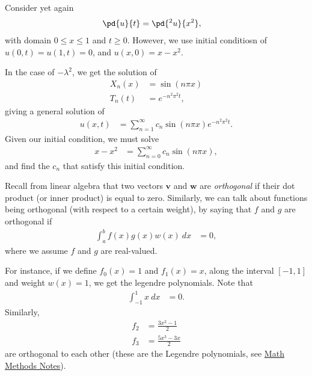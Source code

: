 \documentclass[10pt]{mypackage}
\begin{document}
\begin{example}
  Consider yet again
  \begin{align*}
    \pd{u}{t} &= \pd{^2 u}{x^2},
  \end{align*}
  with domain $0 \leq x \leq 1$ and $t\geq 0$. However, we use initial conditiosn of $u\left( 0,t \right) = u\left( 1,t \right) = 0$, and $u\left( x,0 \right) = x-x^2$.\newline

  In the case of $-\lambda^2$, we get the solution of
  \begin{align*}
    X_n(x) &= \sin\left( n\pi x \right)\\
    T_n\left( t \right) &= e^{-n^2\pi^2 t},
  \end{align*}
  giving a general solution of
  \begin{align*}
    u\left( x,t \right) &= \sum_{n=1}^{\infty}c_n\sin\left( n\pi x \right)e^{-n^2\pi^2 t}.
  \end{align*}
  Given our initial condition, we must solve
  \begin{align*}
    x-x^2 &= \sum_{n=0}^{\infty}c_n\sin\left( n\pi x \right),
  \end{align*}
  and find the $c_n$ that satisfy this initial condition.\newline

  Recall from linear algebra that two vectors $\mathbf{v}$ and $\mathbf{w}$ are \textit{orthogonal} if their dot product (or inner product) is equal to zero. Similarly, we can talk about functions being orthogonal (with respect to a certain weight), by saying that $f$ and $g$ are orthogonal if
  \begin{align*}
    \int_{a}^{b} f(x)g(x)w(x)\:dx &= 0,
  \end{align*}
  where we assume $f$ and $g$ are real-valued.\newline

  For instance, if we define $f_0(x) = 1$ and $f_1(x) = x$, along the interval $[-1,1]$ and weight $w(x) = 1$, we get the legendre polynomials. Note that
  \begin{align*}
    \int_{-1}^{1} x\:dx &= 0.
  \end{align*}
  Similarly,
  \begin{align*}
    f_2 &= \frac{3x^2 - 1}{2}\\
    f_3 &= \frac{5x^3 - 3x}{2}
  \end{align*}
  are orthogonal to each other (these are the Legendre polynomials, see \href{https://ai.avinash-iyer.com/Classes_and_Homework/College/Y4/Y4S1,\%20Math\%20Methods/math_methods_notes.pdf}{Math Methods Notes}).
\end{example}
\end{document}
